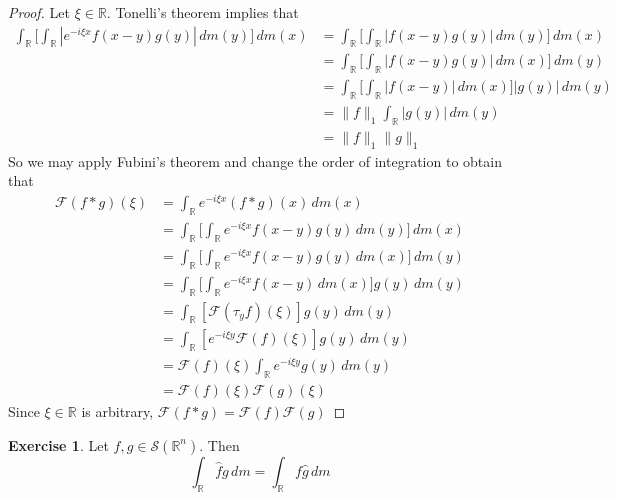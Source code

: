 \documentclass[12pt]{amsart}
\theoremstyle{definition}
\newtheorem{ex}[definition]{Exercise}
\newcommand{\R}{\mathbb{R}}
\newcommand{\MF}{\mathcal{F}}
\newcommand{\MS}{\mathcal{S}}
\newcommand{\dm}{\, d m}
\begin{document}
	\begin{proof}
		Let $\xi \in \R$. Tonelli's theorem implies that  
		\begin{align*}
			\int_{\R} \bigg[ \int_{\R} | e^{-i\xi x} f(x-y)g(y)| \dm(y) \bigg] \dm(x)
			& = \int_{\R}  \bigg[ \int_{\R}  |f(x-y)g(y) |\dm(y) \bigg] \dm(x) \\
			& = \int_{\R}  \bigg[ \int_{\R}  |f(x-y)g(y) |\dm(x) \bigg] \dm(y) \\
			& = \int_{\R}  \bigg[ \int_{\R}  |f(x-y) |\dm(x) \bigg] |g(y)| \dm(y) \\
			& = \|f\|_1 \int_{\R} |g(y)| \dm(y) \\
			& = \|f\|_1\|g\|_1
		\end{align*}
		So we may apply Fubini's theorem and change the order of integration to obtain that
		\begin{align*}
			\MF(f*g)(\xi)
			& = \int_{\R} e^{-i\xi x} (f*g)(x) \dm(x) \\
			& = \int_{\R}  \bigg[ \int_{\R} e^{-i\xi x} f(x-y)g(y) \dm(y) \bigg] \dm(x) \\
			& = \int_{\R}  \bigg[ \int_{\R} e^{-i\xi x} f(x-y)g(y) \dm(x) \bigg] \dm(y) \\
			& = \int_{\R}  \bigg[ \int_{\R} e^{-i\xi x} f(x-y) \dm(x) \bigg] g(y) \dm(y) \\
			& = \int_{\R}  [\MF(\tau_yf)(\xi) ] g(y) \dm(y) \\
			& = \int_{\R}  [e^{-i \xi y}\MF(f)(\xi) ] g(y) \dm(y) \\
			& = \MF(f)(\xi) \int_{\R}  e^{-i \xi y}  g(y) \dm(y) \\
			& = \MF(f)(\xi) \MF(g)(\xi)
		\end{align*}
		Since $\xi \in \R$ is arbitrary, $\MF(f*g) = \MF(f) \MF(g)$
	\end{proof}

	\begin{ex}
		Let $f,g \in \MS(\R^n)$. Then $$\int_{\R}\hat{f} g \dm = \int_{\R}f \hat{g}  \dm$$
	\end{ex}
	
\end{document}
